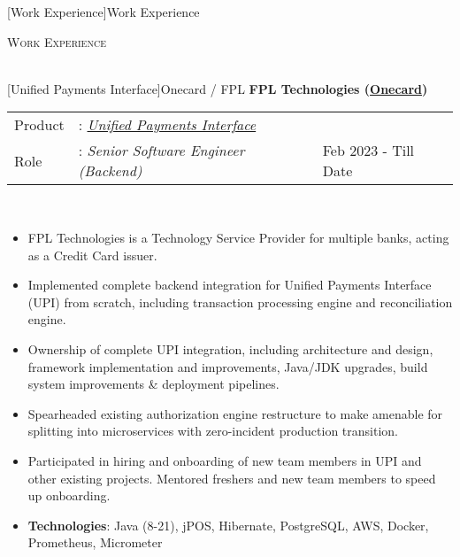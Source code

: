 \documentclass[a4paper]{article}
\newcommand{\lineunder} {
    \vspace*{-8pt} \\
    \hspace*{-18pt} \hrulefill \\
}
\newcommand{\header} [1] {
    {\hspace*{-18pt}\vspace*{6pt} \textsc{#1}}
    \vspace*{-6pt} \lineunder
}
\begin{document}
[Work Experience]{Work Experience}
\header{Work Experience}
\vspace{1mm}

[Unified Payments Interface]{Onecard / FPL}
\textbf{FPL Technologies (\href{https://www.getonecard.app/}{Onecard})} \\
\noindent
\begin{tabularx}{\textwidth}{ l l>{\raggedleft\arraybackslash}X}
	Product & : \textit{\href{https://en.wikipedia.org/wiki/Unified_Payments_Interface}{Unified Payments Interface}} &                      \\
	Role    & : \textit{Senior Software Engineer (Backend)}                                                          & Feb 2023 - Till Date \\
\end{tabularx}
\textbf{} \\
\begin{itemize} \itemsep 1pt
	\item FPL Technologies is a Technology Service Provider for multiple banks, acting as a Credit Card issuer.
	\item Implemented complete backend integration for Unified Payments Interface (UPI) from scratch, including transaction processing engine and reconciliation engine.
	\item Ownership of complete UPI integration, including architecture and design, framework implementation and improvements, Java/JDK upgrades, build system improvements \& deployment pipelines.
	\item Spearheaded existing authorization engine restructure to make amenable for splitting into microservices with zero-incident production transition.
	\item Participated in hiring and onboarding of new team members in UPI and other existing projects. Mentored freshers and new team members to speed up onboarding.
	\item \textbf{Technologies}: Java (8-21), jPOS, Hibernate, PostgreSQL, AWS, Docker, Prometheus, Micrometer
\end{itemize}
\end{document}
